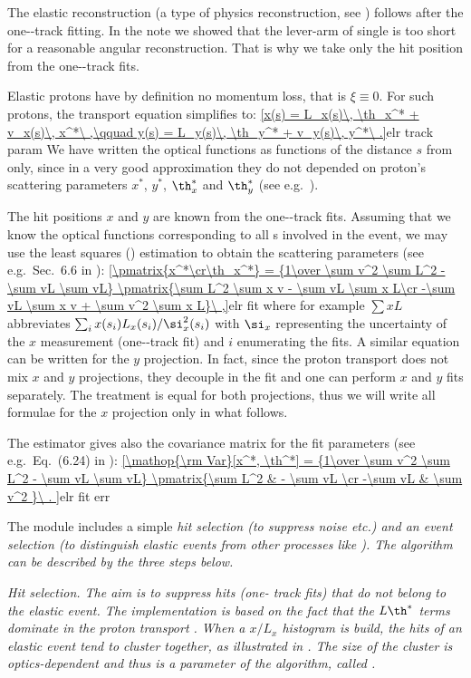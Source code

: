 The elastic reconstruction (a type of physics reconstruction, see ) follows after the one--track fitting. In the note  we showed that the lever-arm of single  is too short for a reasonable angular reconstruction. That is why we take only the hit position from the one--track fits.

Elastic protons have by definition no momentum loss, that is $\xi \equiv 0$. For such protons, the transport equation  simplifies to:
\eqref{x(s) = L_x(s)\, \th_x^* + v_x(s)\, x^*\ ,\qquad y(s) = L_y(s)\, \th_y^* + v_y(s)\, y^*\ .}{elr track param}
We have written the optical functions as functions of the distance $s$ from  only, since in a very good approximation they do not depended on proton's scattering parameters $x^*$, $y^*$, $\th^*_x$ and $\th^*_y$ (see e.g.~).

The hit positions $x$ and $y$ are known from the one--track fits. Assuming that we know the optical functions corresponding to all s involved in the event, we may use the least squares () estimation to obtain the scattering parameters (see e.g.~Sec.~6.6 in ):
\eqref{\pmatrix{x^*\cr\th_x^*} = {1\over \sum v^2 \sum L^2 - \sum vL \sum vL} \pmatrix{\sum L^2 \sum x v - \sum vL \sum x L\cr -\sum vL \sum x v + \sum v^2 \sum x L}\ ,}{elr fit}
where for example $\sum x L$ abbreviates $\sum_{i} x(s_i) L_x(s_i) / \si_x^2(s_i)$ with $\si_x$ representing the uncertainty of the $x$ measurement (one--track fit) and $i$ enumerating the  fits. A similar equation can be written for the $y$ projection. In fact, since the proton transport  does not mix $x$ and $y$ projections, they decouple in the fit and one can perform $x$ and $y$ fits separately. The treatment is equal for both projections, thus we will write all formulae for the $x$ projection only in what follows.

The  estimator gives also the covariance matrix for the fit parameters (see e.g.~Eq.~(6.24) in ):
\eqref{\mathop{\rm Var}[x^*, \th^*] = {1\over \sum v^2 \sum L^2 - \sum vL \sum vL} \pmatrix{\sum L^2 & - \sum vL \cr -\sum vL & \sum v^2 }\ .
}{elr fit err}

The module includes a simple \em{hit selection} (to suppress noise etc.) and an \em{event selection} (to distinguish elastic events from other processes like ). The algorithm can be described by the three steps below.

\bitm
\itm \em{Hit selection}. The aim is to suppress hits (one- track fits) that do not belong to the elastic event. The implementation is based on the fact that the $L\th^*$ terms dominate in the proton transport 
. When a $x/L_x$ histogram is build, the hits of an elastic event tend to cluster together, as illustrated in . The size of the cluster is optics-dependent and thus is a parameter of the algorithm, called .

